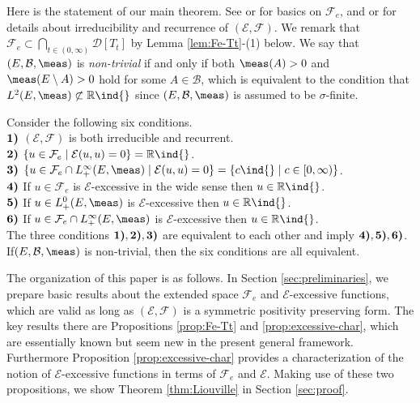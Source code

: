 Here is the statement of our main theorem. See \cite[Section 1.1]{CF} or
\cite[Section 1]{F:Fe} for basics on $\mathcal{F}_{e}$, and
\cite[Sections 1.5 and 1.6]{FOT} or \cite[Section 2.1]{CF} for details about
irreducibility and recurrence of $(\mathcal{E},\mathcal{F})$.
We remark that $\mathcal{F}_{e}\subset\bigcap_{t\in(0,\infty)}\mathcal{D}[T_{t}]$
by Lemma \ref{lem:Fe-Tt}-(1) below.
We say that $(E,\mathcal{B},\meas)$ is \emph{non-trivial} if and only if
both $\meas(A)>0$ and $\meas(E\setminus A)>0$ hold for some $A\in\mathcal{B}$,
which is equivalent to the condition that $L^{2}(E,\meas)\not\subset\mathbb{R}\ind{}$
since $(E,\mathcal{B},\meas)$ is assumed to be $\sigma$-finite.
%
\begin{thm}\label{thm:Liouville}%
Consider the following six conditions.\\
$\textrm{\bfseries\upshape 1)}$
    $(\mathcal{E},\mathcal{F})$ is both irreducible and recurrent.\\
$\textrm{\bfseries\upshape 2)}$
    $\{u\in\mathcal{F}_{e}\mid\mathcal{E}(u,u)=0\}=\mathbb{R}\ind{}$.\\
$\textrm{\bfseries\upshape 3)}$
    $\{u\in\mathcal{F}_{e}\cap L^{\infty}_{+}(E,\meas)\mid\mathcal{E}(u,u)=0\}
    =\{c\ind{}\mid c\in[0,\infty)\}$.\\
$\textrm{\bfseries\upshape 4)}$
    If $u\in\mathcal{F}_{e}$ is $\mathcal{E}$-excessive in the wide sense
    then $u\in\mathbb{R}\ind{}$.\\
$\textrm{\bfseries\upshape 5)}$
    If $u\in L^{0}_{+}(E,\meas)$ is $\mathcal{E}$-excessive
    then $u\in\mathbb{R}\ind{}$.\\
$\textrm{\bfseries\upshape 6)}$
    If $u\in\mathcal{F}_{e}\cap L^{\infty}_{+}(E,\meas)$ is
    $\mathcal{E}$-excessive then $u\in\mathbb{R}\ind{}$.\\
The three conditions
$\textrm{\bfseries\upshape 1)},\textrm{\bfseries\upshape 2)},\textrm{\bfseries\upshape 3)}$
are equivalent to each other and imply
$\textrm{\bfseries\upshape 4)},\textrm{\bfseries\upshape 5)},\textrm{\bfseries\upshape 6)}$.
\!\!If\plb $(E,\mathcal{B},\meas)$ is non-trivial, then the six conditions are all equivalent.
\end{thm}
%

The organization of this paper is as follows. In Section \ref{sec:preliminaries},
we prepare basic results about the extended space $\mathcal{F}_{e}$ and
$\mathcal{E}$-excessive functions, which are valid as long as
$(\mathcal{E},\mathcal{F})$ is a symmetric positivity preserving form.
The key results there are Propositions \ref{prop:Fe-Tt} and \ref{prop:excessive-char},
which are essentially known but seem new in the present general framework.
Furthermore Proposition \ref{prop:excessive-char} provides a characterization of
the notion of $\mathcal{E}$-excessive functions in terms of $\mathcal{F}_{e}$ and $\mathcal{E}$.
Making use of these two propositions, we show Theorem \ref{thm:Liouville}
in Section \ref{sec:proof}.
%
